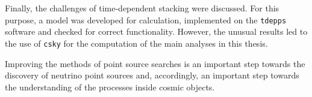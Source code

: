 Finally, the challenges of time-dependent stacking were discussed.
For this purpose, a model was developed for calculation, implemented on the \texttt{tdepps} software and checked for correct functionality.
However, the unusual results led to the use of \texttt{csky} for the computation of the main analyses in this thesis.

Improving the methods of point source searches is an important step towards the discovery of neutrino point sources and, accordingly, an important step towards the understanding of the processes inside cosmic objects.

%
